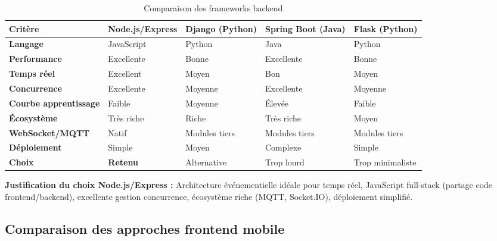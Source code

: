 \begin{table}[htbp]
\centering
\small
\caption{Comparaison des frameworks backend}
\label{tab:backend_comparison}
\begin{tabular}{|p{2.5cm}|p{2.5cm}|p{2.5cm}|p{2.5cm}|p{2.5cm}|}
\hline
\rowcolor{sewesblu!20}
\textbf{Critère} & \textbf{Node.js/Express} & \textbf{Django (Python)} & \textbf{Spring Boot (Java)} & \textbf{Flask (Python)} \\
\hline
\textbf{Langage} & JavaScript & Python & Java & Python \\
\hline
\textbf{Performance} & Excellente & Bonne & Excellente & Bonne \\
\hline
\textbf{Temps réel} & Excellent & Moyen & Bon & Moyen \\
\hline
\textbf{Concurrence} & Excellente & Moyenne & Excellente & Moyenne \\
\hline
\textbf{Courbe apprentissage} & Faible & Moyenne & Élevée & Faible \\
\hline
\textbf{Écosystème} & Très riche & Riche & Très riche & Moyen \\
\hline
\textbf{WebSocket/MQTT} & Natif & Modules tiers & Modules tiers & Modules tiers \\
\hline
\textbf{Déploiement} & Simple & Moyen & Complexe & Simple \\
\hline
\rowcolor{green!10}
\textbf{Choix} & \textbf{Retenu} & Alternative & Trop lourd & Trop minimaliste \\
\hline
\end{tabular}
\end{table}

\textbf{Justification du choix Node.js/Express :} Architecture événementielle idéale pour temps réel, JavaScript full-stack (partage code frontend/backend), excellente gestion concurrence, écosystème riche (MQTT, Socket.IO), déploiement simplifié.

\subsection{Comparaison des approches frontend mobile}

